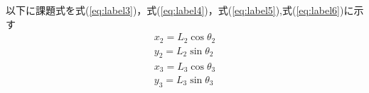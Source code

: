 \documentclass[a4paper,10pt]{jsarticle}
\begin{document}
\noindent 以下に課題式を式(\ref{eq:label3})，式(\ref{eq:label4})，式(\ref{eq:label5}),式(\ref{eq:label6})に示す
\begin{gather}
    x_{2} = L_{2} \cos \theta_{2} 
    \label{eq:label3} \\
    y_{2} = L_{2}\sin \theta_{2} 
    \label{eq:label4} \\
    x_{3} = L_{3} \cos \theta_{3} 
    \label{eq:label5} \\
    y_{3} = L_{3}\sin \theta_{3} 
    \label{eq:label6} 
\end{gather}
\end{document}
